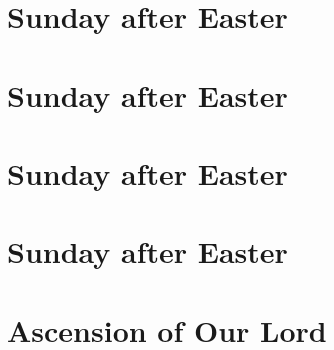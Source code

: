 {{
\section{ Sunday after Easter}
\label{easter2}
\printcommonvespers{}
\def\precollect{\printvrmanenobiscum}
\benedicamusdomino{}
}
{
\section{ Sunday after Easter}
\label{easter3}
\printcommonvespers{}
\def\begincollectcols{\begin{parcolumns}[rulebetween,colwidths={1=0.44\linewidth}]{2}}
\def\precollect{\printvrmanenobiscum}
\benedicamusdomino{}
}

{
\section{ Sunday after Easter}
\label{easter4}
\printcommonvespers{}
\def\precollect{\printvrmanenobiscum}
\benedicamusdomino{}
}

{
\section{ Sunday after Easter}
\label{easter5}
\printcommonvespers{}
\def\premagverses{\oldneedspace{12\baselineskip}}
\def\precollect{\printvrmanenobiscum}
\benedicamusdomino{}
}

{
\section{Ascension of Our Lord}
\label{ascension}
\subtitle{ Class, White or Gold}
\subtitle{I \& II Vespers}

\def\premagnificat{\oldneedspace{7\baselineskip}}
\def\premagverses{\greseteolcustos{manual}}
\def\begincollectcols{%
\begin{parcolumns}[rulebetween,colwidths={1=0.46\linewidth}]{2}}
\def\definevesperspropers{
    \def\prepsalmfive{\greseteolcustos{manual}}
}
\def\definevesperspropersalt{
}
\def\vesperspropersnote{At II Vespers:}
\def\vesperspropersaltnote{At I Vespers:}
\let\printhymnnote=\undefined
\def\hymnlabel{hymn-salutishumanaesator}

}}
